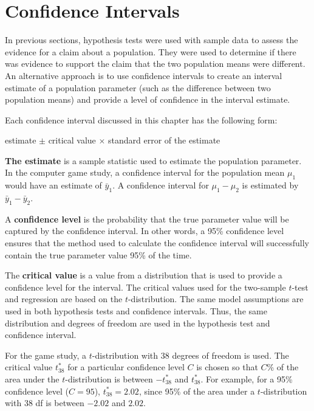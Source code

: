\documentclass[
]{report}
\begin{document}
\hypertarget{confidence-intervals}{%
\section{\texorpdfstring{\textbf{Confidence Intervals}}{Confidence Intervals}}\label{confidence-intervals}}

In previous sections, hypothesis tests were used with sample data to assess the evidence for a claim about a population. They were used to determine if there was evidence to support the claim that the two population means were different. An alternative approach is to use confidence intervals to create an interval estimate of a population parameter (such as the difference between two population means) and provide a level of confidence in the interval estimate.

Each confidence interval discussed in this chapter has the following form:

estimate \(\pm\) critical value \(\times\) standard error of the estimate

\textbf{The estimate} is a sample statistic used to estimate the population parameter. In the computer game study, a confidence interval for the population mean \(\mu_1\) would have an estimate of \(\bar{y}_1\). A confidence interval for \(\mu_1 - \mu_2\) is estimated by \(\bar{y}_1 - \bar{y}_2\).

A \textbf{confidence level} is the probability that the true parameter value will be captured by the confidence interval. In other words, a 95\% confidence level ensures that the method used to calculate the confidence interval will successfully contain the true parameter value 95\% of the time.

The \textbf{critical value} is a value from a distribution that is used to provide a confidence level for the interval. The critical values used for the two-sample \(t\)-test and regression are based on the \(t\)-distribution. The same model assumptions are used in both hypothesis tests and confidence intervals. Thus, the same distribution and degrees of freedom are used in the hypothesis test and confidence interval.

For the game study, a \(t\)-distribution with 38 degrees of freedom is used. The critical value \(t^*_{38}\) for a particular confidence level \(C\) is chosen so that \(C\)\% of the area under the \(t\)-distribution is between \(-t^*_{38}\) and \(t^*_{38}\). For example, for a 95\% confidence level (\(C = 95\)), \(t^*_{38} = 2.02\), since 95\% of the area under a \(t\)-distribution with 38 df is between \(-2.02\) and \(2.02\).
\end{document}
